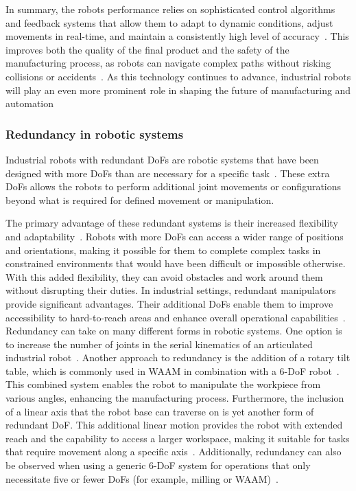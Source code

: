 In summary, the robots performance relies on sophisticated control algorithms and feedback systems that allow them to adapt to dynamic conditions, adjust movements in real-time, and maintain a consistently high level of accuracy~\cite{Lin.2023}. This improves both the quality of the final product and the safety of the manufacturing process, as robots can navigate complex paths without risking collisions or accidents~\cite{Bosscher.2011}.
As this technology continues to advance, industrial robots will play an even more prominent role in shaping the future of manufacturing and automation~\cite{Domae.2019}


\subsubsection{Redundancy in robotic systems}

Industrial robots with redundant \acrshort{DoF}s are robotic systems that have been designed with more \acrshort{DoF}s than are necessary for a specific task~\cite{Wang.2022}. These extra \acrshort{DoF}s allows the robots to perform additional joint movements or configurations beyond what is required for defined movement or manipulation.

The primary advantage of these redundant systems is their increased flexibility and adaptability~\cite{Duong.2021}. Robots with more \acrshort{DoF}s can access a wider range of positions and orientations, making it possible for them to complete complex tasks in constrained environments that would have been difficult or impossible otherwise. With this added flexibility, they can avoid obstacles and work around them without disrupting their duties. In industrial settings, redundant manipulators provide significant advantages. Their additional \acrshort{DoF}s enable them to improve accessibility to hard-to-reach areas and enhance overall operational capabilities~\cite{Shi.2021}.  Redundancy can take on many different forms in robotic systems. One option is to increase the number of joints in the serial kinematics of an articulated industrial robot~\cite{Milenkovic.2021}. \newline
Another approach to redundancy is the addition of a rotary tilt table, which is commonly used in \acrshort{WAAM} in combination with a 6-\acrshort{DoF} robot~\cite{Yuan.2020}. This combined system enables the robot to manipulate the workpiece from various angles, enhancing the manufacturing process.
Furthermore, the inclusion of a linear axis that the robot base can traverse on is yet another form of redundant \acrshort{DoF}. This additional linear motion provides the robot with extended reach and the capability to access a larger workspace, making it suitable for tasks that require movement along a specific axis~\cite{Boscariol.2019}.
Additionally, redundancy can also be observed when using a generic 6-\acrshort{DoF} system for operations that only necessitate five or fewer \acrshort{DoF}s (for example, milling or \acrshort{WAAM})~\cite{Hanafusa.1981,Wang.2022}. %



